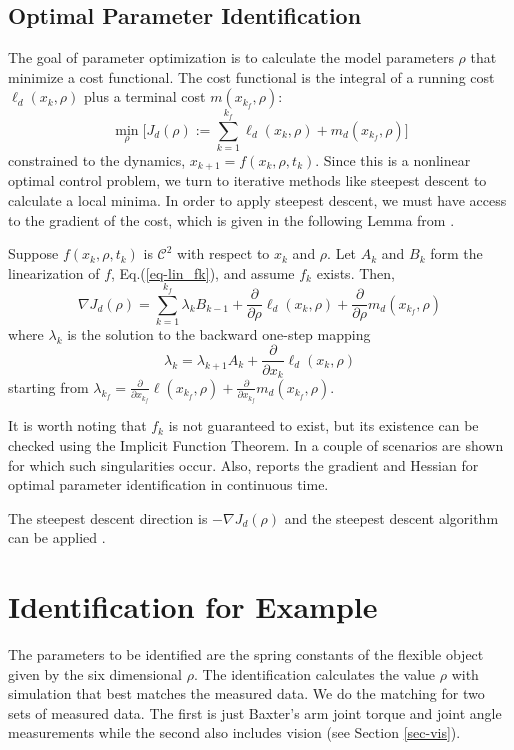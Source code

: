 \documentclass[runningheads,a4paper]{llncs}
\begin{document}
\subsection{Optimal Parameter Identification \label{sec-opt}}
The goal of parameter optimization is to calculate the model parameters $\rho$ that minimize a cost functional.  The cost functional is the integral of a running cost $\ell_d(x_k,\rho)$ plus a terminal cost $m(x_{k_f},\rho)$:
\[
\min_{\rho} \Big[J_d(\rho):=\sum_{k=1}^{k_f}\ell_d(x_k,\rho) + m_d(x_{k_f},\rho)\Big]
\]
constrained to the dynamics, $x_{k+1} = f(x_k,\rho,t_k)$. Since this is a nonlinear optimal control problem, we turn to iterative methods like steepest descent to calculate a local minima. In order to apply steepest descent, we must have access to the gradient of the cost, which is given in the following Lemma from \cite{caldwell_coleman_correll_iros}. 
\begin{lemma}
\label{lem-grad_a}
Suppose $f(x_k,\rho,t_k)$ is $\mathcal{C}^2$ with respect to $x_k$ and $\rho$.  Let $A_k$ and $B_k$ form the linearization of $f$, Eq.(\ref{eq-lin_fk}), and assume $f_k$ exists.  Then,
\begin{equation}
\nabla J_d(\rho) = \sum_{k = 1}^{k_f}\lambda_kB_{k-1} +\frac{\partial}{\partial \rho}\ell_d(x_k,\rho) + \frac{\partial}{\partial \rho}m_d(x_{k_f},\rho)
\label{eq-DJa}
\end{equation}
where $\lambda_k$ is the solution to the backward one-step mapping
\begin{equation}
\lambda_k = \lambda_{k+1}A_{k} + \frac{\partial}{\partial x_{k}}\ell_d(x_{k},\rho) 
\label{eq-lambda}
\end{equation}
starting from $\lambda_{k_f} = \frac{\partial}{\partial x_{k_f}}\ell(x_{k_f},\rho) + \frac{\partial}{\partial x_{k_f}}m_d(x_{k_f},\rho)$.  
\end{lemma}

It is worth noting that $f_k$ is not guaranteed to exist, but its existence can be checked using the Implicit Function Theorem. In \cite{johnson_schultz_murphey} a couple of scenarios are shown for which such singularities occur.  Also, \cite{miller_murphey} reports the gradient and Hessian for optimal parameter identification in continuous time.

The steepest descent direction is $-\nabla J_d(\rho)$ and the steepest descent algorithm can be applied \cite{kelley}.

\section{Identification for Example}
\label{sec-id_eg}
The parameters to be identified are the spring constants of the flexible object given by the six dimensional $\rho$.  The identification calculates the value $\rho$ with simulation that best matches the measured data. We do the matching for two sets of measured data.  The first is just Baxter's arm joint torque and joint angle measurements while the second also includes vision (see Section \ref{sec-vis}).  
\end{document}
